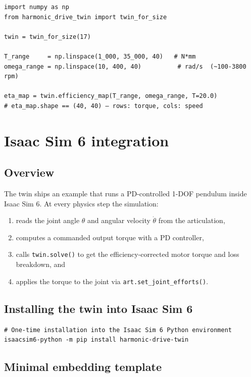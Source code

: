 \documentclass[11pt,a4paper]{article}
\begin{document}
\begin{lstlisting}
import numpy as np
from harmonic_drive_twin import twin_for_size

twin = twin_for_size(17)

T_range     = np.linspace(1_000, 35_000, 40)   # N*mm
omega_range = np.linspace(10, 400, 40)          # rad/s  (~100-3800 rpm)

eta_map = twin.efficiency_map(T_range, omega_range, T=20.0)
# eta_map.shape == (40, 40) — rows: torque, cols: speed
\end{lstlisting}

\section{Isaac Sim 6 integration}

\subsection{Overview}

The twin ships an example that runs a PD-controlled 1-DOF pendulum inside
Isaac Sim 6.  At every physics step the simulation:

\begin{enumerate}
  \item reads the joint angle \(\theta\) and angular velocity \(\dot{\theta}\)
        from the articulation,
  \item computes a commanded output torque with a PD controller,
  \item calls \texttt{twin.solve()} to get the efficiency-corrected motor
        torque and loss breakdown, and
  \item applies the torque to the joint via
        \texttt{art.set\_joint\_efforts()}.
\end{enumerate}

\subsection{Installing the twin into Isaac Sim 6}

\begin{lstlisting}
# One-time installation into the Isaac Sim 6 Python environment
isaacsim6-python -m pip install harmonic-drive-twin
\end{lstlisting}

\subsection{Minimal embedding template}
\end{document}
